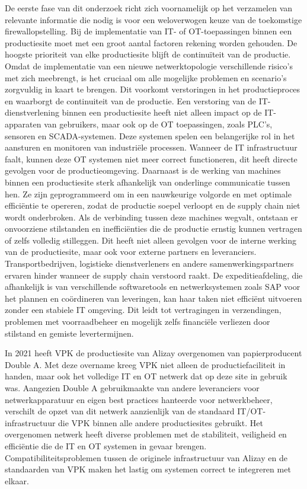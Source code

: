 De eerste fase van dit onderzoek richt zich voornamelijk op het verzamelen van relevante informatie die nodig is voor een weloverwogen keuze van de toekomstige firewallopstelling. Bij de implementatie van IT- of OT-toepassingen binnen een productiesite moet met een groot aantal factoren rekening worden gehouden. De hoogste prioriteit van elke productiesite blijft de continuïteit van de productie. Omdat de implementatie van een nieuwe netwerktopologie verschillende risico’s met zich meebrengt, is het cruciaal om alle mogelijke problemen en scenario’s zorgvuldig in kaart te brengen. Dit voorkomt verstoringen in het productieproces en waarborgt de continuiteit van de productie.
Een verstoring van de IT-dienstverlening binnen een productiesite heeft niet alleen impact op de IT-apparaten van gebruikers, maar ook op de OT toepassingen, zoals PLC’s, sensoren en SCADA-systemen. Deze systemen spelen een belangerijke rol in het aansturen en monitoren van industriële processen. Wanneer de IT infrastructuur faalt, kunnen deze OT systemen niet meer correct functioneren, dit heeft directe gevolgen voor de productieomgeving. Daarnaast is de werking van machines binnen een productiesite sterk afhankelijk van onderlinge communicatie tussen hen. Ze zijn geprogrammeerd om in een nauwkeurige volgorde en met optimale efficiëntie te opereren, zodat de productie soepel verloopt en de supply chain niet wordt onderbroken. Als de verbinding tussen deze machines wegvalt, ontstaan er onvoorziene stilstanden en inefficiënties die de productie ernstig kunnen vertragen of zelfs volledig stilleggen. Dit heeft niet alleen gevolgen voor de interne werking van de productiesite, maar ook voor externe partners en leveranciers. Transportbedrijven, logistieke dienstverleners en andere samenwerkingspartners ervaren hinder wanneer de supply chain verstoord raakt. De expeditieafdeling, die afhankelijk is van verschillende softwaretools en netwerksystemen zoals SAP voor het plannen en coördineren van leveringen, kan haar taken niet efficiënt uitvoeren zonder een stabiele IT omgeving. Dit leidt tot vertragingen in verzendingen, problemen met voorraadbeheer en mogelijk zelfs financiële verliezen door stilstand en gemiste levertermijnen.

In 2021 heeft VPK de productiesite van Alizay overgenomen van papierproducent Double A. Met deze overname kreeg VPK niet alleen de productiefaciliteit in handen, maar ook het volledige IT en OT netwerk dat op deze site in gebruik was. Aangezien Double A gebruikmaakte van andere leveranciers voor netwerkapparatuur en eigen best practices hanteerde voor netwerkbeheer, verschilt de opzet van dit netwerk aanzienlijk van de standaard IT/OT-infrastructuur die VPK binnen alle andere productiesites gebruikt.
Het overgenomen netwerk heeft diverse problemen met de stabiliteit, veiligheid en efficiëntie die de IT en OT systemen in gevaar brengen. Compatibiliteitsproblemen tussen de originele infrastructuur van Alizay en de standaarden van VPK maken het lastig om systemen correct te integreren met elkaar.


